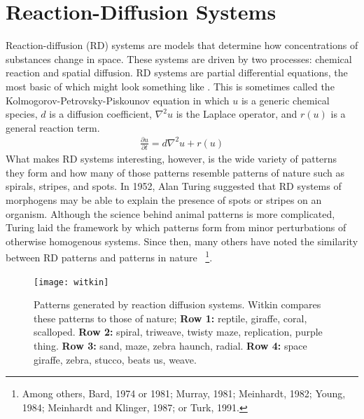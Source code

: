 \chapter{Reaction-Diffusion Systems}

	Reaction-diffusion (RD) systems are models that determine how concentrations of substances change in space. These systems are driven by two processes: chemical reaction and spatial diffusion. RD systems are partial differential equations, the most basic of which might look something like . This is sometimes called the Kolmogorov-Petrovsky-Piskounov equation in which $u$ is a generic chemical species, $d$ is a diffusion coefficient, $\nabla^2 u$ is the Laplace operator, and $r(u)$ is a general reaction term.
	\begin{align}
		\frac{\partial u}{\partial t} = d \nabla^2 u + r(u)
		\label{eq:KPP}
	\end{align}
What makes RD systems interesting, however, is the wide variety of patterns they form and how many of those patterns resemble patterns of nature such as spirals, stripes, and spots. In 1952, Alan Turing suggested that RD systems of morphogens may be able to explain the presence of spots or stripes on an organism. Although the science behind animal patterns is more complicated, Turing laid the framework by which patterns form from minor perturbations of otherwise homogenous systems. Since then, many others have noted the similarity between RD patterns and patterns in nature~
\footnote{Among others, Bard, 1974 or 1981; Murray, 1981; Meinhardt, 1982; Young, 1984; Meinhardt and Klinger, 1987; or Turk, 1991.}.

\begin{figure}[h]
	\centering
	\texttt{[image: witkin]}
         \caption{Patterns generated by reaction diffusion systems. Witkin compares these patterns to those of nature; \textbf{Row 1:} reptile, giraffe, coral, scalloped. \textbf{Row 2:} spiral, triweave, twisty maze, replication, purple thing. \textbf{Row 3:} sand, maze, zebra haunch, radial. \textbf{Row 4:} space giraffe, zebra, stucco, beats us, weave.} \label{fig:witkin}
\end{figure}
	
